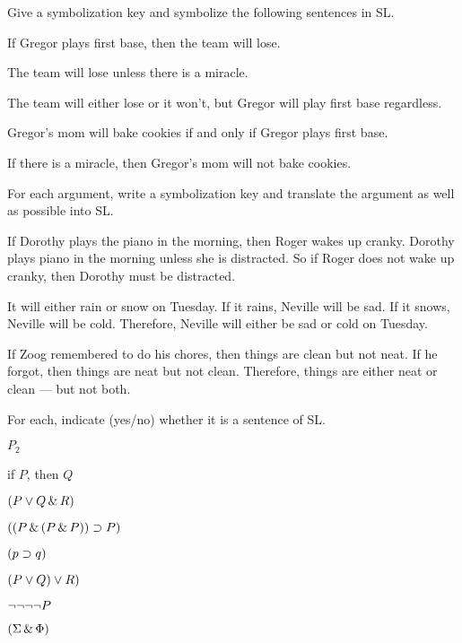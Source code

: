 \solutions
\problempart
\label{pr.gregorbaseball}
Give a symbolization key and symbolize the following sentences in SL.
\begin{earg}
\item If Gregor plays first base, then the team will lose.
\item The team will lose unless there is a miracle.
\item The team will either lose or it won't, but Gregor will play first base regardless.
\item Gregor's mom will bake cookies if and only if Gregor plays first base.
\item If there is a miracle, then Gregor's mom will not bake cookies.
\end{earg}


\problempart
\label{pr.choresSL}
For each argument, write a symbolization key and translate the argument as well as possible into SL.
\begin{earg}
\item If Dorothy plays the piano in the morning, then Roger wakes up cranky. Dorothy plays piano in the morning unless she is distracted. So if Roger does not wake up cranky, then Dorothy must be distracted.
\item It will either rain or snow on Tuesday. If it rains, Neville will be sad. If it snows, Neville will be cold. Therefore, Neville will either be sad or cold on Tuesday.
\item If Zoog remembered to do his chores, then things are clean but not neat. If he forgot, then things are neat but not clean. Therefore, things are either neat or clean --- but not both.
\end{earg}



\problempart
\label{HW2.A}
For each, indicate (yes/no) whether it is a sentence of SL.
\begin{earg}
		\item $P_{2}$
		\item if $P$, then $Q$
		\item $(P \vee Q \,\&\, R)$
		\item $((P \,\&\, (P \,\&\, P)) \supset P)$
		\item $(p \supset q)$
		\item $(P \vee Q) \vee R)$
		\item $\neg \neg \neg \neg P$
		\item $(\Sigma \,\&\, \Phi)$
	\end{earg}

